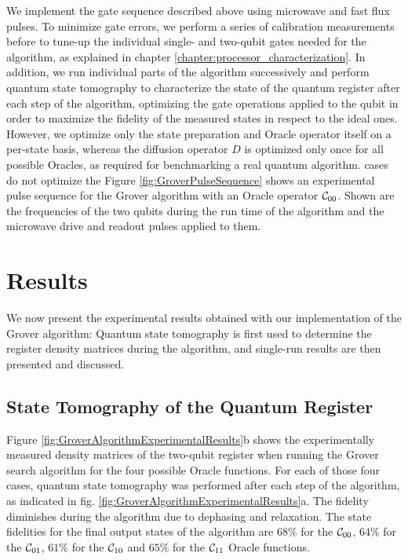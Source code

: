 We implement the gate sequence described above using microwave and fast flux pulses. To minimize gate errors, we perform a series of calibration measurements before to tune-up the individual single- and two-qubit gates needed for the algorithm, as explained in chapter \ref{chapter:processor_characterization}. In addition, we run individual parts of the algorithm successively and perform quantum state tomography to characterize the state of the quantum register after each step of the algorithm, optimizing the gate operations applied to the qubit in order to maximize the fidelity of the measured states in respect to the ideal ones. However, we optimize only the state preparation and Oracle operator itself on a per-state basis, whereas the diffusion operator $D$ is optimized only once for all possible Oracles, as required for benchmarking a real quantum algorithm. cases do not optimize the  Figure \ref{fig:GroverPulseSequence} shows an experimental pulse sequence for the Grover algorithm with an Oracle operator $\Or_{00}$. Shown are the frequencies of the two qubits during the run time of the algorithm and the microwave drive and readout pulses applied to them.

\section{Results}

We now present the experimental results obtained with our implementation of the Grover algorithm: Quantum state tomography is first used to determine the register density matrices during the algorithm, and single-run results are then presented and discussed.

\subsection{State Tomography of the Quantum Register}

Figure \ref{fig:GroverAlgorithmExperimentalResults}b shows the experimentally measured density matrices of the two-qubit register when running the Grover search algorithm for the four possible Oracle functions. For each of those four cases, quantum state tomography was performed after each step of the algorithm, as indicated in fig. \ref{fig:GroverAlgorithmExperimentalResults}a. The fidelity diminishes during the algorithm due to dephasing and relaxation. The state fidelities for the final output states of the algorithm are $68\%$ for the $\Or_{00}$, $64\%$ for the $\Or_{01}$, $61\%$ for the $\Or_{10}$ and $65\%$ for the $\Or_{11}$ Oracle functions.

